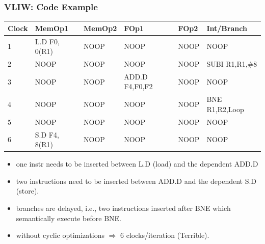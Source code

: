 \documentclass{beamer}
\begin{document}
\begin{frame}[fragile,t]
    \frametitle{VLIW: Code Example}


\begin{tiny}
\begin{tabular}{llllll}
\hline
Clock   & MemOp1          & MemOp2 & FOp1  & FOp2 & Int/Branch    \\\hline
1       & L.D   F0, 0(R1) & NOOP   & NOOP  & NOOP & NOOP \\
2       & NOOP            & NOOP   & NOOP  & NOOP & SUBI R1,R1,\#8\\
3       & NOOP            & NOOP   & ADD.D F4,F0,F2  & NOOP & NOOP\\
4       & NOOP            & NOOP   & NOOP  & NOOP & BNE R1,R2,Loop\\
5       & NOOP            & NOOP   & NOOP  & NOOP & NOOP\\
6       & S.D F4, 8(R1)   & NOOP   & NOOP  & NOOP & NOOP\\\hline
\end{tabular}
\end{tiny}

\smallskip
\pause 

\begin{itemize}
    \item one instr needs to be inserted between L.D (load)
            and the dependent ADD.D
    \item two instructions need to be inserted between ADD.D
            and the dependent S.D (store).
    \item branches are delayed, i.e., two instructions inserted
            after BNE which semantically execute before BNE.
    \item without cyclic optimizations $\Rightarrow$ \alert{6 clocks/iteration (Terrible)}.
\end  {itemize}

\end{frame}
\end{document}
